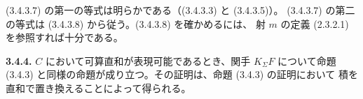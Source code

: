 \clearpage
{}%
\begingroup
\small

(3.4.3.7) の第一の等式は明らかである（(3.4.3.3) と (3.4.3.5)）。
(3.4.3.7) の第二の等式は (3.4.3.8) から従う。(3.4.3.8) を確かめるには、
射 $m$ の定義 (2.3.2.1) を参照すれば十分である。

\noindent\textbf{3.4.4.}\quad
$C$ において可算直和が表現可能であるとき、関手 $K_{\Sigma}F$ について命題
(3.4.3) と同様の命題が成り立つ。その証明は、命題 (3.4.3) の証明において
積を直和で置き換えることによって得られる。
\endgroup
